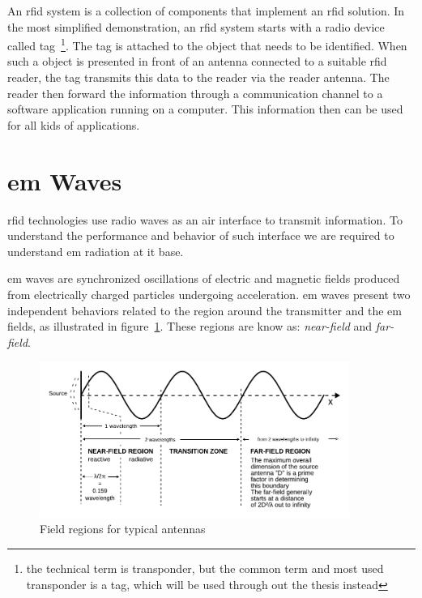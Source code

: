 An \ac{rfid} system is a collection of components that implement an \ac{rfid} solution. In the most simplified demonstration, an \ac{rfid} system starts with a radio device called tag~\footnote{the technical term is transponder, but the common term and most used transponder is a tag, which will be used through out the thesis instead}. The tag is attached to the object that needs to be identified. When such a object is presented in front of an antenna connected to a suitable \ac{rfid} reader, the tag transmits this data to the reader via the reader antenna. The reader then forward the information through a communication channel to a software application running on a computer. This information then can be used for all kids of applications.

\section{\acl{em} Waves}

\ac{rfid} technologies use radio waves as an air interface to transmit information. To understand the performance and behavior of such interface we are required to understand \ac{em} radiation at it base.

\ac{em} waves are synchronized oscillations of electric and magnetic fields produced from electrically charged particles undergoing acceleration.
\ac{em} waves present two independent behaviors related to the region around the transmitter and the \ac{em} fields, as illustrated in figure~\ref{fig:fieldregions}. 
These regions are know as: \emph{near-field} and \emph{far-field}.

\begin{figure}[!ht]
    \centering
    \includegraphics[width=0.9\textwidth]{./figs/02-state-of-the-art/Field_regions_for_typical_antennas_vector.pdf}
    \caption{Field regions for typical antennas~\cite{SafetyHealthTopics}} 
    \label{fig:fieldregions}
\end{figure}

